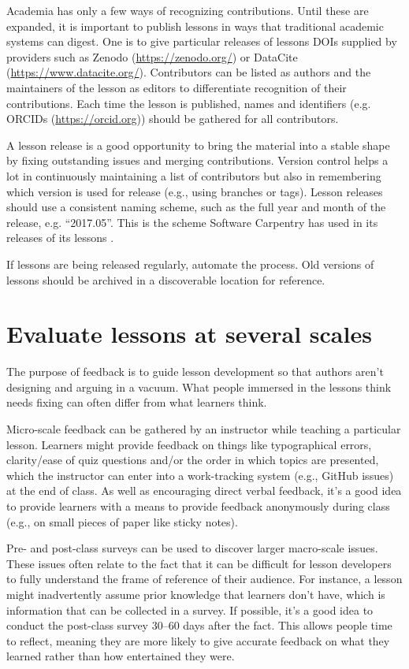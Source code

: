 \documentclass[10pt,letterpaper]{article}
\newcommand{\rulemajor}[1]{\section{#1}}
\begin{document}
Academia has only a few ways of recognizing contributions.
Until these are expanded,
it is important to publish lessons in ways that traditional academic systems can digest.
One is to give particular releases of lessons
DOIs supplied by providers such as Zenodo (\url{https://zenodo.org/})
or DataCite (\url{https://www.datacite.org/}).
Contributors can be listed as authors
and the maintainers of the lesson as editors
to differentiate recognition of their contributions.
Each time the lesson is published,
names and identifiers (e.g. ORCIDs (\url{https://orcid.org}))
should be gathered for all contributors.

A lesson release is a good opportunity to bring the material into a stable shape
by fixing outstanding issues and merging contributions.
Version control helps a lot in continuously maintaining a list of contributors
but also in remembering which version is used for release
(e.g., using branches or tags).
Lesson releases should use a consistent naming scheme,
such as the full year and month of the release,
e.g. ``2017.05''.
This is the scheme Software Carpentry has used in
its releases of its lessons \cite{shell2015,shell2017}.

If lessons are being released regularly,
automate the process.
Old versions of lessons should be archived in a discoverable location for reference.

\rulemajor{Evaluate lessons at several scales}

The purpose of feedback is to guide lesson development
so that authors aren't designing and arguing in a vacuum.
What people immersed in the lessons think needs fixing
can often differ from what learners think.

Micro-scale feedback can be gathered by an instructor while teaching a particular lesson.
Learners might provide feedback on things like typographical errors,
clarity/ease of quiz questions and/or the order in which topics are presented,
which the instructor can enter into a work-tracking system (e.g., GitHub issues) at the end of class.
As well as encouraging direct verbal feedback,
it's a good idea to provide learners with a means to provide feedback anonymously during class
(e.g., on small pieces of paper like sticky notes).

Pre- and post-class surveys can be used to discover larger macro-scale issues.
These issues often relate to the fact that it can be difficult for lesson developers
to fully understand the frame of reference of their audience.
For instance, a lesson might inadvertently assume prior knowledge that learners don't have,
which is information that can be collected in a survey.
If possible, it's a good idea to conduct the post-class survey 30--60 days after the fact.
This allows people time to reflect,
meaning they are more likely to give accurate feedback on what they learned
rather than how entertained they were.
\end{document}
